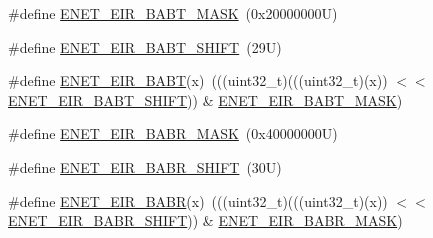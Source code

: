 \begin{DoxyCompactItemize}
\item 
\#define \mbox{\hyperlink{group___e_n_e_t___register___masks_ga2ee6dd7628d551b9a94c482a567d21fa}{E\+N\+E\+T\+\_\+\+E\+I\+R\+\_\+\+B\+A\+B\+T\+\_\+\+M\+A\+SK}}~(0x20000000\+U)
\item 
\#define \mbox{\hyperlink{group___e_n_e_t___register___masks_ga316dbe501e294bfeedecda20bb81cdc6}{E\+N\+E\+T\+\_\+\+E\+I\+R\+\_\+\+B\+A\+B\+T\+\_\+\+S\+H\+I\+FT}}~(29\+U)
\item 
\#define \mbox{\hyperlink{group___e_n_e_t___register___masks_gaebf97379f4b8fd312c9e6b74618a1447}{E\+N\+E\+T\+\_\+\+E\+I\+R\+\_\+\+B\+A\+BT}}(x)~(((uint32\+\_\+t)(((uint32\+\_\+t)(x)) $<$$<$ \mbox{\hyperlink{group___e_n_e_t___register___masks_ga316dbe501e294bfeedecda20bb81cdc6}{E\+N\+E\+T\+\_\+\+E\+I\+R\+\_\+\+B\+A\+B\+T\+\_\+\+S\+H\+I\+FT}})) \& \mbox{\hyperlink{group___e_n_e_t___register___masks_ga2ee6dd7628d551b9a94c482a567d21fa}{E\+N\+E\+T\+\_\+\+E\+I\+R\+\_\+\+B\+A\+B\+T\+\_\+\+M\+A\+SK}})
\item 
\#define \mbox{\hyperlink{group___e_n_e_t___register___masks_gaa0d5f950cb5b2252eda9744944f88f17}{E\+N\+E\+T\+\_\+\+E\+I\+R\+\_\+\+B\+A\+B\+R\+\_\+\+M\+A\+SK}}~(0x40000000\+U)
\item 
\#define \mbox{\hyperlink{group___e_n_e_t___register___masks_gabde85bd2d6099ccd0d7b5a48b648a3b2}{E\+N\+E\+T\+\_\+\+E\+I\+R\+\_\+\+B\+A\+B\+R\+\_\+\+S\+H\+I\+FT}}~(30\+U)
\item 
\#define \mbox{\hyperlink{group___e_n_e_t___register___masks_gac7c3f09d1bae01f46593680a9ec6b514}{E\+N\+E\+T\+\_\+\+E\+I\+R\+\_\+\+B\+A\+BR}}(x)~(((uint32\+\_\+t)(((uint32\+\_\+t)(x)) $<$$<$ \mbox{\hyperlink{group___e_n_e_t___register___masks_gabde85bd2d6099ccd0d7b5a48b648a3b2}{E\+N\+E\+T\+\_\+\+E\+I\+R\+\_\+\+B\+A\+B\+R\+\_\+\+S\+H\+I\+FT}})) \& \mbox{\hyperlink{group___e_n_e_t___register___masks_gaa0d5f950cb5b2252eda9744944f88f17}{E\+N\+E\+T\+\_\+\+E\+I\+R\+\_\+\+B\+A\+B\+R\+\_\+\+M\+A\+SK}})
\end{DoxyCompactItemize}
